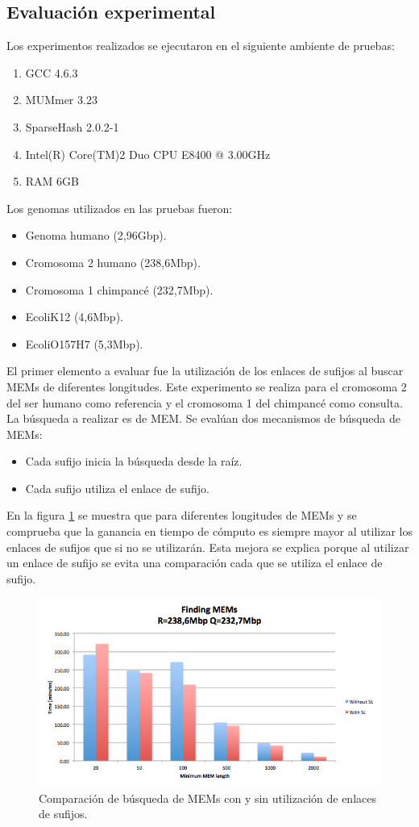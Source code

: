 \documentclass[12pt,a4paper]{article}
\begin{document}
\subsection{Evaluación experimental}
\indent
Los experimentos realizados se ejecutaron en el siguiente ambiente de pruebas:
\begin{enumerate}
\item GCC 4.6.3
\item MUMmer 3.23
\item SparseHash 2.0.2-1
\item Intel(R) Core(TM)2 Duo CPU     E8400  @ 3.00GHz
\item RAM 6GB
\end{enumerate}
\indent
Los genomas utilizados en las pruebas fueron:
\begin{itemize}
\item Genoma humano (2,96Gbp).
\item Cromosoma 2 humano (238,6Mbp).
\item Cromosoma 1 chimpancé (232,7Mbp).
\item EcoliK12 (4,6Mbp).
\item EcoliO157H7 (5,3Mbp).
\end{itemize}
\indent
El primer elemento a evaluar fue la utilización de los enlaces de sufijos al buscar MEMs de diferentes longitudes. Este experimento se realiza para el cromosoma 2 del ser humano como referencia y el cromosoma 1 del chimpancé como consulta. La búsqueda a realizar es de MEM. Se evalúan dos mecanismos de búsqueda de MEMs:
\begin{itemize}
\item Cada sufijo inicia la búsqueda desde la raíz.
\item Cada sufijo utiliza el enlace de sufijo.
\end{itemize}
\indent
En la figura \ref{fig:sl-nosl} se muestra que para diferentes longitudes de MEMs y se comprueba que la ganancia en tiempo de cómputo es siempre mayor al utilizar los enlaces de sufijos que si no se utilizarán. Esta mejora se explica porque al utilizar un enlace de sufijo se evita una comparación cada que se utiliza el enlace de sufijo.\\
\begin{figure}[h]
\begin{center}
\includegraphics[scale=0.4]{sl-nosl.png}
\caption{Comparación de búsqueda de MEMs con y sin utilización de enlaces de sufijos.}
\label{fig:sl-nosl}
\end{center}
\end{figure}
\end{document}
